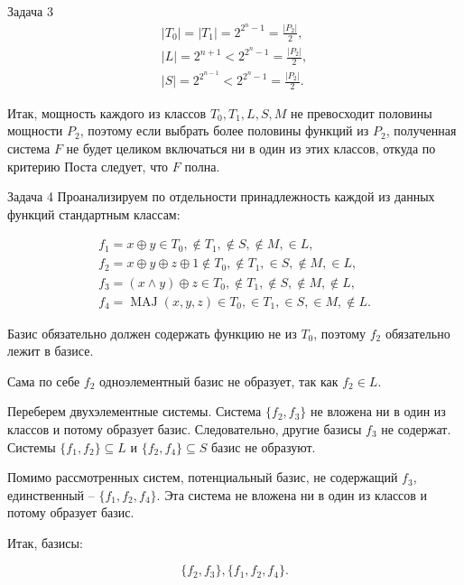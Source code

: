 \documentclass{article}
\DeclareMathOperator{\maj}{MAJ}
\newcommand{\abs}[1]{\left\lvert#1\right\rvert}
\begin{document}
\begin{section}{Задача 3}
		\begin{gather*}
			\abs{T_0} = \abs{T_1} = 2^{2^n-1} = \frac{\abs{P_2}}{2}, \\
			\abs{L} = 2^{n+1} < 2^{2^n-1} = \frac{\abs{P_2}}{2}, \\
			\abs{S} = 2^{2^{n-1}} < 2^{2^n-1} = \frac{\abs{P_2}}{2}.
		\end{gather*}

		Итак, мощность каждого из классов $T_0, T_1, L, S, M$ не превосходит половины мощности $P_2$, поэтому если выбрать более половины функций из $P_2$, полученная система $F$ не будет целиком включаться ни в один из этих классов, откуда по критерию Поста следует, что $F$ полна.
	\end{section}

	\begin{section}{Задача 4}
		Проанализируем по отдельности принадлежность каждой из данных функций стандартным классам:

		\begin{gather*}
			f_1 = x \oplus y \in T_0, \not\in T_1, \not\in S, \not\in M, \in L, \\
			f_2 = x \oplus y \oplus z \oplus 1 \not\in T_0, \not\in T_1, \in S, \not\in M, \in L, \\
			f_3 = (x \land y) \oplus z \in T_0, \not\in T_1, \not\in S, \not\in M, \not\in L, \\
			f_4 = \maj(x, y, z) \in T_0, \in T_1, \in S, \in M, \not\in L.
		\end{gather*}

		Базис обязательно должен содержать функцию не из $T_0$, поэтому $f_2$ обязательно лежит в базисе.

		Сама по себе $f_2$ одноэлементный базис не образует, так как $f_2 \in L$.

		Переберем двухэлементные системы. Система $\{f_2, f_3\}$ не вложена ни в один из классов и потому образует базис. Следовательно, другие базисы $f_3$ не содержат. Системы $\{f_1, f_2\} \subseteq L$ и $\{f_2, f_4\} \subseteq S$ базис не образуют.

		Помимо рассмотренных систем, потенциальный базис, не содержащий $f_3$, единственный -- $\{f_1, f_2, f_4\}$. Эта система не вложена ни в один из классов и потому образует базис.

		Итак, базисы:

		\begin{equation*}
			\{f_2, f_3\}, \{f_1, f_2, f_4\}.
		\end{equation*}
	\end{section}
\end{document}
